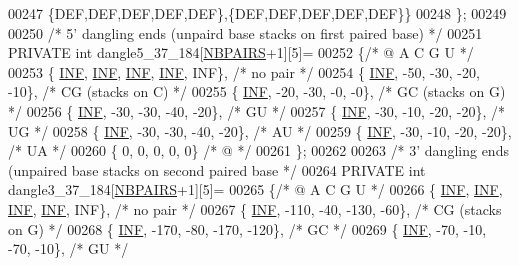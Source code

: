 \begin{DoxyCode}
00247    \{DEF,DEF,DEF,DEF,DEF\},\{DEF,DEF,DEF,DEF,DEF\}\}
00248 \};
00249 
00250 \textcolor{comment}{/* 5' dangling ends (unpaird base stacks on first paired base) */}
00251 PRIVATE \textcolor{keywordtype}{int} dangle5\_37\_184[\hyperlink{energy__const_8h_a5e75221c779d618eab81e096f37e32ce}{NBPAIRS}+1][5]=
00252 \{\textcolor{comment}{/*   @     A     C     G     U   */}
00253    \{ \hyperlink{energy__const_8h_a12c2040f25d8e3a7b9e1c2024c618cb6}{INF},  \hyperlink{energy__const_8h_a12c2040f25d8e3a7b9e1c2024c618cb6}{INF},  \hyperlink{energy__const_8h_a12c2040f25d8e3a7b9e1c2024c618cb6}{INF},  \hyperlink{energy__const_8h_a12c2040f25d8e3a7b9e1c2024c618cb6}{INF},  INF\}, \textcolor{comment}{/* no pair */}
00254    \{ \hyperlink{energy__const_8h_a12c2040f25d8e3a7b9e1c2024c618cb6}{INF},  -50,  -30,  -20,  -10\}, \textcolor{comment}{/* CG  (stacks on C) */}
00255    \{ \hyperlink{energy__const_8h_a12c2040f25d8e3a7b9e1c2024c618cb6}{INF},  -20,  -30,   -0,   -0\}, \textcolor{comment}{/* GC  (stacks on G) */}
00256    \{ \hyperlink{energy__const_8h_a12c2040f25d8e3a7b9e1c2024c618cb6}{INF},  -30,  -30,  -40,  -20\}, \textcolor{comment}{/* GU */}
00257    \{ \hyperlink{energy__const_8h_a12c2040f25d8e3a7b9e1c2024c618cb6}{INF},  -30,  -10,  -20,  -20\}, \textcolor{comment}{/* UG */}
00258    \{ \hyperlink{energy__const_8h_a12c2040f25d8e3a7b9e1c2024c618cb6}{INF},  -30,  -30,  -40,  -20\}, \textcolor{comment}{/* AU */}
00259    \{ \hyperlink{energy__const_8h_a12c2040f25d8e3a7b9e1c2024c618cb6}{INF},  -30,  -10,  -20,  -20\}, \textcolor{comment}{/* UA */}
00260    \{   0,    0,     0,    0,   0\}  \textcolor{comment}{/*  @ */}
00261 \};
00262 
00263 \textcolor{comment}{/* 3' dangling ends (unpaired base stacks on second paired base */}
00264 PRIVATE \textcolor{keywordtype}{int} dangle3\_37\_184[\hyperlink{energy__const_8h_a5e75221c779d618eab81e096f37e32ce}{NBPAIRS}+1][5]=
00265 \{\textcolor{comment}{/*   @     A     C     G     U   */}
00266    \{ \hyperlink{energy__const_8h_a12c2040f25d8e3a7b9e1c2024c618cb6}{INF},  \hyperlink{energy__const_8h_a12c2040f25d8e3a7b9e1c2024c618cb6}{INF},  \hyperlink{energy__const_8h_a12c2040f25d8e3a7b9e1c2024c618cb6}{INF},  \hyperlink{energy__const_8h_a12c2040f25d8e3a7b9e1c2024c618cb6}{INF},  INF\},  \textcolor{comment}{/* no pair */}
00267    \{ \hyperlink{energy__const_8h_a12c2040f25d8e3a7b9e1c2024c618cb6}{INF}, -110,  -40, -130,  -60\},  \textcolor{comment}{/* CG  (stacks on G) */}
00268    \{ \hyperlink{energy__const_8h_a12c2040f25d8e3a7b9e1c2024c618cb6}{INF}, -170,  -80, -170, -120\},  \textcolor{comment}{/* GC */}
00269    \{ \hyperlink{energy__const_8h_a12c2040f25d8e3a7b9e1c2024c618cb6}{INF},  -70,  -10,  -70,  -10\},  \textcolor{comment}{/* GU */}

\end{DoxyCode}
